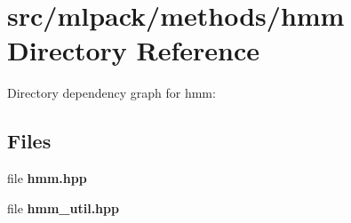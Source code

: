 \section{src/mlpack/methods/hmm Directory Reference}
\label{dir_fd81c5850f80220f973a66c0aaac6977}
Directory dependency graph for hmm\-:
\subsection*{Files}
\begin{DoxyCompactItemize}
\item 
file {\bf hmm.\-hpp}
\item 
file {\bf hmm\-\_\-util.\-hpp}
\end{DoxyCompactItemize}
